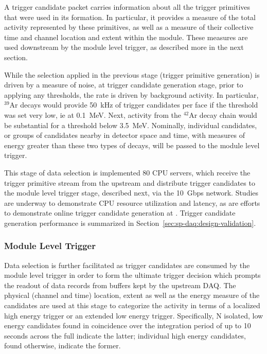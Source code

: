 A trigger candidate packet carries information about all the trigger
primitives that were used in its formation. 
In particular, it provides a measure of the total activity represented
by these primitives, as well as a measure of their collective time and channel
location and extent within the module.
These measures are used downstream by the module level trigger, 
as described more in the next section.

While the selection applied in the previous stage (trigger primitive
generation) is driven by a measure of noise, at trigger candidate
generation stage, prior to applying any thresholds, the rate is driven by
background activity.  
In particular, $^{39}$Ar decays would provide \SI{50}{\kilo\hertz} of
trigger candidates per  face if the threshold was set very low, ie at
\SI{0.1}{\MeV}.
Next, activity from the $^{42}$Ar decay chain would be substantial for a
threshold below \SI{3.5}{\MeV}.
Nominally, individual candidates, or groups of candidates nearby in
detector space and time, with measures of energy greater than these two
types of decays, will be passed to the module level trigger. 

This stage of data selection is implemented 80  CPU servers, which receive the trigger primitive
stream from the upstream  and distribute trigger candidates to the module level trigger
stage, described next, via the \SI{10}{Gbps}  network. Studies are underway to demonstrate CPU
resource utilization and latency, as are efforts to demonstrate online trigger candidate generation
at . Trigger candidate generation performance is summarized in
Section~\ref{sec:sp-daq:design-validation}. 



\subsubsection{Module Level Trigger}
\label{sec:daq:mlt}

Data selection is further facilitated as trigger candidates are consumed
by the module level trigger in order to form the ultimate trigger
decision which prompts the readout of data records from buffers kept by the upstream DAQ. 
The physical (channel and time) location, extent as well as the energy measure of the
candidates are used at this stage to categorize the activity in terms
of a localized high energy trigger or an extended low energy trigger. 
Specifically, N isolated, low energy candidates found in coincidence
over the integration period of up to 10 seconds across the full 
indicate the latter; individual high energy candidates, found
otherwise, indicate the former.

